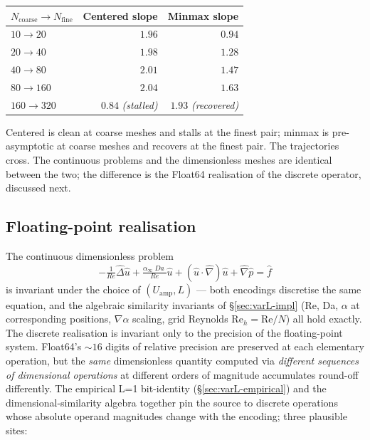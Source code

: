 \documentclass[11pt]{article}
\newcommand{\Reyn}{\operatorname{\mathit{Re}}}
\newcommand{\Damk}{\operatorname{\mathit{Da}}}
\begin{document}
\begin{center}
\begin{tabular}{lrr}
  \toprule
  $N_{\mathrm{coarse}} \to N_{\mathrm{fine}}$ & Centered slope & Minmax slope \\
  \midrule
  $10 \to 20$   & $1.96$ & $0.94$ \\
  $20 \to 40$   & $1.98$ & $1.28$ \\
  $40 \to 80$   & $2.01$ & $1.47$ \\
  $80 \to 160$  & $2.04$ & $1.63$ \\
  $160 \to 320$ & $\mathbf{0.84}$ \emph{(stalled)} & $\mathbf{1.93}$ \emph{(recovered)} \\
  \bottomrule
\end{tabular}
\end{center}

\noindent Centered is clean at coarse meshes and stalls at the finest
pair; minmax is pre-asymptotic at coarse meshes and recovers at the
finest pair. The trajectories cross. The continuous problems and the
dimensionless meshes are identical between the two; the difference is
the Float64 realisation of the discrete operator, discussed next.

\subsection{Floating-point realisation}
\label{sec:varL-fp}

The continuous dimensionless problem
\begin{equation}
  -\tfrac{1}{\Reyn} \widehat{\Delta} \hat{u}
  + \tfrac{\alpha_\infty \Damk}{\Reyn} \hat{u}
  + (\hat{u} \cdot \widehat{\nabla}) \hat{u}
  + \widehat{\nabla} \hat{p}
  = \hat{f}
  \label{eq:dimless-ns}
\end{equation}
is invariant under the choice of $(U_{\mathrm{amp}}, L)$ — both encodings
discretise the same equation, and the algebraic similarity invariants
of §\ref{sec:varL-impl} (Re, Da, $\alpha$ at corresponding positions,
$\nabla\alpha$ scaling, grid Reynolds $\mathrm{Re}_h = \mathrm{Re}/N$)
all hold exactly. The discrete realisation is invariant only to the
precision of the floating-point system. Float64's $\sim 16$ digits of
relative precision are preserved at each elementary operation, but the
\emph{same} dimensionless quantity computed via \emph{different
sequences of dimensional operations} at different orders of magnitude
accumulates round-off differently. The empirical L=1 bit-identity
(§\ref{sec:varL-empirical}) and the dimensional-similarity algebra
together pin the source to discrete operations whose absolute operand
magnitudes change with the encoding; three plausible sites:
\end{document}

